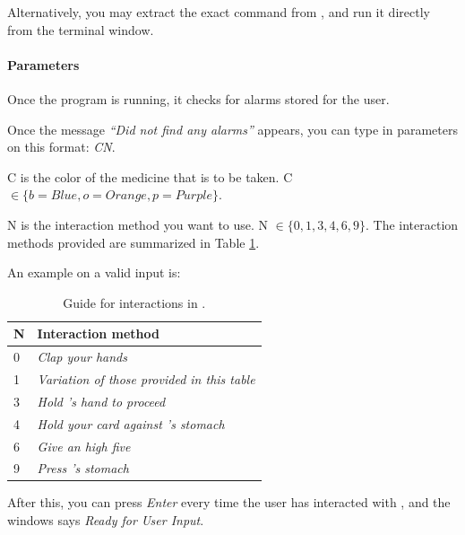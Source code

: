 
Alternatively, you may extract the exact command from , and run it directly from the terminal window. 

\paragraph{Parameters}

Once the program is running, it checks for alarms stored for the user. 

Once the message \emph{``Did not find any alarms''} appears, you can type in parameters on this format: \emph{CN}. 

C is the color of the medicine that is to be taken. C $\in \{ b = Blue, o = Orange, p = Purple \}$.

N is the interaction method you want to use. N $\in \{ 0, 1, 3, 4, 6, 9\}$. The interaction methods provided are summarized in Table \ref{tab:interactionmethodsguide}.

An example on a valid input is:


\begin{table}[H]
\begin{tabular}{|p{3.0cm} | p{7.0cm}|}
\hline
\textbf{N} & \textbf{Interaction method} \\
\hline
0 & \emph{Clap your hands} \\
\hline
1 & \emph{Variation of those provided in this table} \\
\hline
3 & \emph{Hold \ab{}'s hand to proceed} \\
\hline
4 & \emph{Hold your card against \ab{}'s stomach}\\
\hline
6 & \emph{Give an high five} \\
\hline
9 & \emph{Press \ab{}'s stomach} \\
\hline
\end{tabular}
\caption{Guide for interactions in \ab{}.}
\label{tab:interactionmethodsguide}
\end{table}

After this, you can press \emph{Enter} every time the user has interacted with \ab{}, and the windows says \emph{Ready for User Input}. 